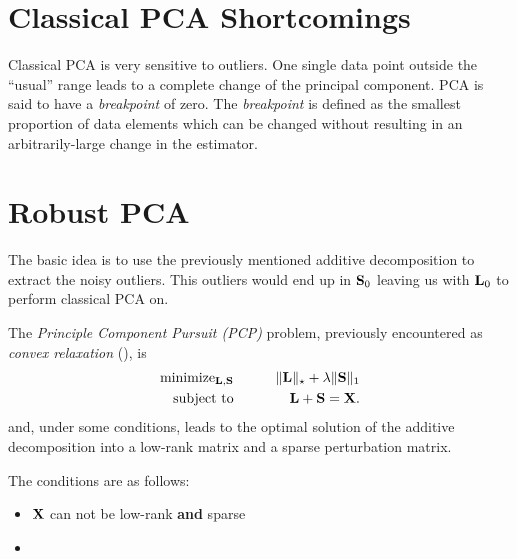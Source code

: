 \section{Classical PCA Shortcomings}
Classical PCA is very sensitive to outliers. One single data point outside the ``usual'' range leads to a complete change of the principal component. PCA is said to have a \emph{breakpoint} of zero. The \emph{breakpoint} is defined as the smallest proportion of data elements which can be changed without resulting in an arbitrarily-large change in the estimator.

\section{Robust PCA}
The basic idea is to use the previously mentioned additive decomposition to extract the noisy outliers. This outliers would end up in \(\boldsymbol{\mathrm{S}}_0\) leaving us with \(\boldsymbol{\mathrm{L}}_0\) to perform classical PCA on.

The \emph{Principle Component Pursuit (PCP)} problem, previously encountered as \emph{convex relaxation} (), is
\begin{eqnarray*}
\text{minimize}_{\boldsymbol{\mathrm{L}}, \boldsymbol{\mathrm{S}}}& \quad\quad &\|\boldsymbol{\mathrm{L}}\|_\star + \lambda \|\boldsymbol{\mathrm{S}}\|_1\\
\text{subject to}& &\boldsymbol{\mathrm{L}} + \boldsymbol{\mathrm{S}} = \boldsymbol{\mathrm{X}}.
\end{eqnarray*}
and, under some conditions, leads to the optimal solution of the additive decomposition into a low-rank matrix and a sparse perturbation matrix.

The conditions are as follows:
\begin{itemize}
	\item \(\boldsymbol{\mathrm{X}}\) can not be low-rank \textbf{and} sparse
	\item {}
\end{itemize}
